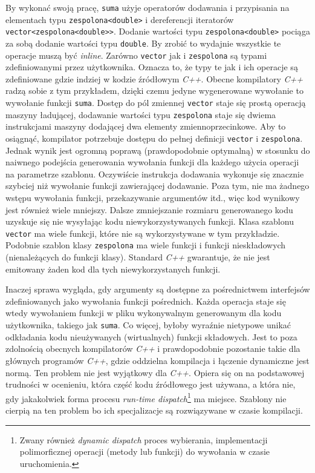\documentclass[11pt, a4paper]{article}
\begin{document}
By wykonać swoją pracę, \verb#suma# użyje operatorów dodawania i przypisania na elementach typu \verb#zespolona<double># i dereferencji iteratorów \verb#vector<zespolona<double>>#.  Dodanie wartości typu \verb#zespolona<double># pociąga za sobą dodanie wartości typu \verb#double#. By zrobić to wydajnie wszystkie te operacje muszą być \emph{inline}.  Zarówno \verb#vector# jak i \verb#zespolona# są typami zdefiniowanymi przez użytkownika. Oznacza to, że typy te jak i ich operacje są zdefiniowane gdzie indziej w kodzie źródłowym \emph{C++}. Obecne kompilatory \emph{C++} radzą sobie z tym przykładem, dzięki czemu jedyne wygenerowane wywołanie to wywołanie funkcji \verb#suma#. Dostęp do pól zmiennej \verb#vector# staje się prostą operacją maszyny ładującej, dodawanie wartości typu \verb#zespolona# staje się dwiema instrukcjami maszyny dodającej dwa elementy zmiennoprzecinkowe. Aby to osiągnąć, kompilator potrzebuje dostępu do pełnej definicji \verb#vector# i \verb#zespolona#. Jednak wynik jest ogromną poprawą (prawdopodobnie optymalną) w stosunku do naiwnego podejścia generowania wywołania funkcji dla każdego użycia operacji na parametrze szablonu. Oczywiście instrukcja dodawania wykonuje się znacznie szybciej niż wywołanie funkcji zawierającej dodawanie. Poza tym, nie ma żadnego wstępu wywołania funkcji, przekazywanie argumentów itd., więc kod wynikowy jest również wiele mniejszy. Dalsze zmniejszanie rozmiaru generowanego kodu uzyskuje się nie wysyłając kodu niewykorzystywanych funkcji. Klasa szablonu \verb#vector# ma wiele funkcji, które nie są wykorzystywane w tym przykładzie. Podobnie szablon klasy \verb#zespolona# ma wiele funkcji i funkcji nieskładowych (nienależących do funkcji klasy). Standard \emph{C++} gwarantuje, że nie jest emitowany żaden kod dla tych niewykorzystanych funkcji. 

Inaczej sprawa wygląda, gdy argumenty są dostępne za pośrednictwem interfejsów zdefiniowanych jako wywołania funkcji pośrednich. Każda operacja staje się wtedy wywołaniem funkcji w pliku wykonywalnym generowanym dla kodu użytkownika, takiego jak \verb#suma#. Co więcej, byłoby wyraźnie nietypowe unikać odkładania kodu nieużywanych (wirtualnych) funkcji składowych. Jest to poza zdolnością obecnych kompilatorów \emph{C++} i prawdopodobnie pozostanie takie dla głównych programów \emph{C++}, gdzie oddzielna kompilacja i łączenie dynamiczne jest normą. Ten problem nie jest wyjątkowy dla \emph{C++}. Opiera się on na podstawowej trudności w ocenieniu, która część kodu źródłowego jest używana, a która nie, gdy jakakolwiek forma procesu \emph{run-time dispatch}\footnote{Zwany również \emph{dynamic dispatch} proces wybierania, implementacji polimorficznej operacji (metody lub funkcji) do wywołania w czasie uruchomienia.} ma miejsce. Szablony nie cierpią na ten problem bo ich specjalizacje są rozwiązywane w czasie kompilacji.\newline
\end{document}
